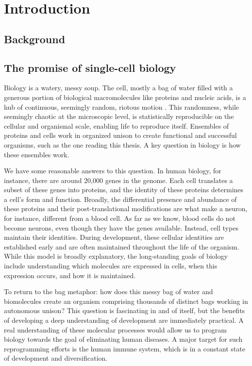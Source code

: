 \chapter{Introduction}

\section{Background}

\section{The promise of single-cell biology}
Biology is a watery, messy soup. The cell, mostly a bag of water filled with a generous portion of biological macromolecules like proteins and nucleic acids, is a hub of continuous, seemingly random, riotous motion \cite{berg1993random}. This randomness, while seemingly chaotic at the microscopic level, is statistically reproducible on the cellular and organismal scale, enabling life to reproduce itself. Ensembles of proteins and cells work in organized unison to create functional and successful organisms, such as the one reading this thesis. A key question in biology is how these ensembles work.

We have some reasonable answers to this question. In human biology, for instance, there are around 20,000 genes in the genome. Each cell translates a subset of these genes into proteins, and the identity of these proteins determines a cell's form and function. Broadly, the differential presence and abundance of these proteins and their post-translational modifications are what make a neuron, for instance, different from a blood cell. As far as we know, blood cells do not become neurons, even though they have the genes available. Instead, cell types maintain their identities. During development, these cellular identities are established early and are often maintained throughout the life of the organism. While this model is broadly explanatory, the long-standing goals of biology include understanding which molecules are expressed in cells, when this expression occurs, and how it is maintained.

To return to the bag metaphor: how does this messy bag of water and biomolecules create an organism comprising thousands of distinct bags working in autonomous unison? This question is fascinating in and of itself, but the benefits of developing a deep understanding of development are immediately practical. A real understanding of these molecular processes would allow us to program biology towards the goal of eliminating human diseases. A major target for such reprogramming efforts is the human immune system, which is in a constant state of development and diversification.

